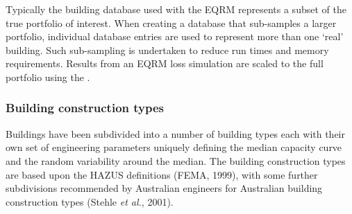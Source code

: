 Typically the building database used with
the EQRM represents a subset of the true portfolio of interest.
When creating a database that sub-samples a larger portfolio,
individual database entries are used to represent more than one
`real' building. Such sub-sampling is undertaken to reduce run
times and memory requirements. Results from an EQRM  loss
simulation are scaled to the full portfolio using the \typesf.


\subsubsection{Building construction types}
\label{sec:grids-constructionclass}

Buildings have been subdivided into a number of building
types each with their own set of engineering
parameters uniquely defining the median capacity
curve and the random variability around the
median. The building construction types are
based upon the HAZUS definitions (FEMA, 1999),%
with some further subdivisions recommended by Australian engineers for
Australian building construction types (Stehle \textit{et al.}, 2001).%

